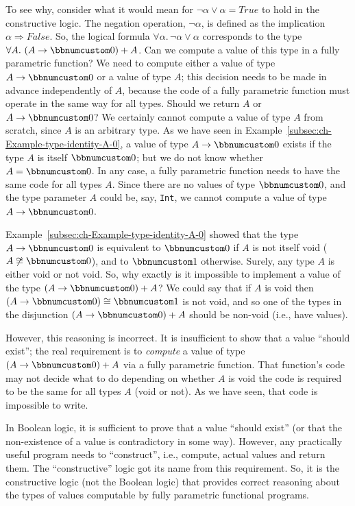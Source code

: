 To see why, consider what it would mean for $\neg\alpha\vee\alpha=True$
to hold in the constructive logic. The negation operation, $\neg\alpha$,
is defined as the implication $\alpha\Rightarrow False$. So, the
logical formula $\forall\alpha.\,\neg\alpha\vee\alpha$ corresponds
to the type $\forall A.\,\left(A\rightarrow\bbnum 0\right)+A$. Can
we compute a value of this type in a fully parametric function? We
need to compute either a value of type $A\rightarrow\bbnum 0$ or
a value of type $A$; this decision needs to be made in advance independently
of $A$, because the code of a fully parametric function must operate
in the same way for all types. Should we return $A$ or $A\rightarrow\bbnum 0$?
We certainly cannot compute a value of type $A$ from scratch, since
$A$ is an arbitrary type. As we have seen in Example~\ref{subsec:ch-Example-type-identity-A-0},
a value of type $A\rightarrow\bbnum 0$ exists if the type $A$ is
itself $\bbnum 0$; but we do not know whether $A=\bbnum 0$. In any
case, a fully parametric function needs to have the same code for
all types $A$. Since there are no values of type $\bbnum 0$, and
the type parameter $A$ could be, say, \lstinline!Int!, we cannot
compute a value of type $A\rightarrow\bbnum 0$.

Example~\ref{subsec:ch-Example-type-identity-A-0} showed that the
type $A\rightarrow\bbnum 0$ is equivalent to $\bbnum 0$ if $A$
is not itself void ($A\not\cong\bbnum 0$), and to $\bbnum 1$ otherwise.
Surely, any type $A$ is either void or not void. So, why exactly
is it impossible to implement a value of the type $\left(A\rightarrow\bbnum 0\right)+A$?
We could say that if $A$ is void then $\left(A\rightarrow\bbnum 0\right)\cong\bbnum 1$
is not void, and so one of the types in the disjunction $\left(A\rightarrow\bbnum 0\right)+A$
should be non-void (i.e., have values).

However, this reasoning is incorrect. It is insufficient to show that
a value \textsf{``}should exist\textsf{''}; the real requirement is to \emph{compute}
a value of type $\left(A\rightarrow\bbnum 0\right)+A$ via a fully
parametric function. That function\textsf{'}s code may not decide what to do
depending on whether $A$ is void \textemdash{} the code is required
to be the same for all types $A$ (void or not). As we have seen,
that code is impossible to write.

In Boolean logic, it is sufficient to prove that a value \textsf{``}should
exist\textsf{''} (or that the non-existence of a value is contradictory in
some way). However, any practically useful program needs to \textsf{``}construct\textsf{''},
i.e., compute, actual values and return them. The \textsf{``}constructive\textsf{''}
logic got its name from this requirement. So, it is the constructive
logic (not the Boolean logic) that provides correct reasoning about
the types of values computable by fully parametric functional programs.

